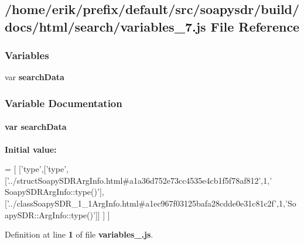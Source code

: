 \subsection{/home/erik/prefix/default/src/soapysdr/build/docs/html/search/variables\+\_\+7.js File Reference}
\label{variables__7_8js}
\subsubsection*{Variables}
\begin{DoxyCompactItemize}
\item 
var {\bf search\+Data}
\end{DoxyCompactItemize}


\subsubsection{Variable Documentation}
\paragraph[{search\+Data}]{\setlength{\rightskip}{0pt plus 5cm}var search\+Data}\label{variables__7_8js_ad01a7523f103d6242ef9b0451861231e}
{\bfseries Initial value\+:}
\begin{DoxyCode}
=
[
  [\textcolor{stringliteral}{'type'},[\textcolor{stringliteral}{'type'},[\textcolor{stringliteral}{'../structSoapySDRArgInfo.html#a1a36d752e73cc4535e4cb1f5f78af812'},1,\textcolor{stringliteral}{'
      SoapySDRArgInfo::type()'}],[\textcolor{stringliteral}{'../classSoapySDR\_1\_1ArgInfo.html#a1ec967f03125bafa28cdde0e31c81c2f'},1,\textcolor{stringliteral}{'SoapySDR::ArgInfo::type()'}]]
      ]
]
\end{DoxyCode}


Definition at line {\bf 1} of file {\bf variables\+\_.\+js}.

